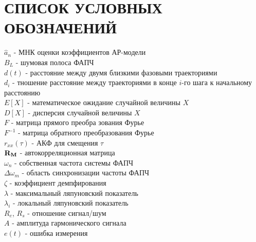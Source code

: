 \section*{СПИСОК УСЛОВНЫХ ОБОЗНАЧЕНИЙ}
\noindent
${\hat{a}_n}$ - МНК оценки коэффициентов АР-модели		\\
${B_L}$ - шумовая полоса ФАПЧ					\\
${d(t)}$ - расстояние между двумя близкими фазовыми траекториями	\\
${d_i}$ - тношение расстояние между траекториями в конце ${i}$-го шага к начальному расстоянию\\
${E[X]}$ - математическое ожидание случайной величины $X$	\\
${D[X]}$ - дисперсия случайной величины $X$			\\
${F}$ - матрица прямого преобра зования Фурье			\\
${F^{-1}}$ - матрица обратного преобразования Фурье		\\
${r_{xx}(\tau)}$ - АКФ для смещения ${\tau}$			\\
${\bf{R_M}}$ - автокорреляционная матрица			\\
${\omega_n}$ - собственная частота системы ФАПЧ			\\
${\Delta \omega_m}$ - область синхронизации частоты ФАПЧ	\\
${\zeta}$ - коэффициент демпфирования				\\
${\lambda}$ - максимальный ляпуновский показатель		\\
${\lambda_{i}}$ - локальный ляпуновский показатель		\\
${R_e}$, ${R_s}$ - отношение сигнал/шум				\\
${A}$ - амплитуда гармонического сигнала			\\
${e(t)}$ - ошибка измерения					\\
\newpage
